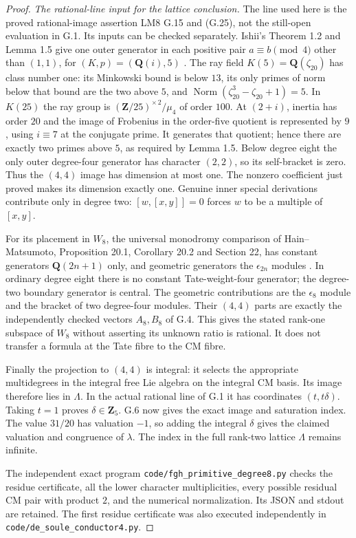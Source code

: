 \begin{proof}
\emph{The rational-line input for the lattice conclusion.}
The line used here is the proved rational-image assertion
LM8 G.15 and (G.25), not the still-open evaluation in G.1.
Its inputs can be checked separately.
Ishii's Theorem 1.2 and Lemma 1.5 give one outer
generator in each positive pair $a\equiv b\pmod4$
other than $(1,1)$, for $(K,p)=(\mathbf Q(i),5)$
\cite{fghIshiiGraded}. The ray field $K(5)=\mathbf
Q(\zeta_{20})$ has class number one: its Minkowski
bound is below $13$, its only primes of norm below
that bound are the two above $5$, and
$\operatorname{Norm}(\zeta_{20}^3-\zeta_{20}+1)=5$.
In $K(25)$ the ray group is
$(\mathbf Z/25)^{\times\,2}/\mu_4$ of order $100$.
At $(2+i)$, inertia has order $20$ and the image
of Frobenius in the order-five quotient is represented
by $9$, using $i\equiv7$ at the conjugate prime.
It generates that quotient; hence there are exactly
two primes above $5$, as required by Lemma 1.5.
Below degree eight the only outer degree-four
generator has character $(2,2)$, so its self-bracket
is zero. Thus the $(4,4)$ image has dimension at
most one. The nonzero coefficient just proved makes
its dimension exactly one. Genuine inner special
derivations contribute only in degree two:
$[w,[x,y]]=0$ forces $w$ to be a multiple of $[x,y]$.

For its placement in $W_8$, the universal monodromy
comparison of Hain--Matsumoto, Proposition 20.1,
Corollary 20.2 and Section 22, has constant generators
$\mathbf Q(2n+1)$ only, and geometric generators
the $\epsilon_{2n}$ modules
\cite{fghUniversalMEM}. In ordinary degree eight
there is no constant Tate-weight-four generator;
the degree-two boundary generator is central.
The geometric contributions are the $\epsilon_8$
module and the bracket of two degree-four modules.
Their $(4,4)$ parts are exactly the independently
checked vectors $A_8,B_8$ of G.4.
This gives the stated rank-one subspace of $W_8$
without asserting its unknown ratio is rational.
It does not transfer a formula at the Tate fibre
to the CM fibre.

Finally the projection to $(4,4)$ is integral: it
selects the appropriate multidegrees in the integral
free Lie algebra on the integral CM basis. Its image
therefore lies in $\Lambda$. In the actual rational
line of G.1 it has coordinates $(t,t\delta)$.
Taking $t=1$ proves $\delta\in\mathbf Z_5$.
G.6 now gives the exact image and saturation index.
The value $31/20$ has valuation $-1$, so adding the
integral $\delta$ gives the claimed valuation and
congruence of $\lambda$. The index in the full
rank-two lattice $\Lambda$ remains infinite.

The independent exact program
\texttt{code/fgh\_primitive\_degree8.py} checks the
residue certificate, all the lower character
multiplicities, every possible residual CM pair with
product $2$, and the numerical normalization.
Its JSON and stdout are retained. The first residue
certificate was also executed independently in
\texttt{code/de\_soule\_conductor4.py}.
\end{proof}
